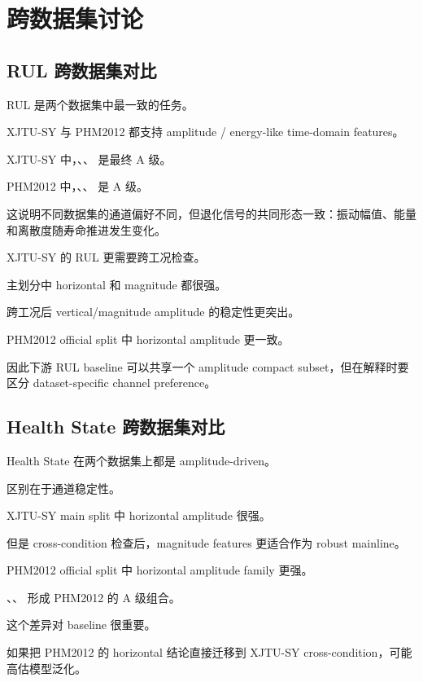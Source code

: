 \section{跨数据集讨论}

\subsection{RUL 跨数据集对比}

RUL 是两个数据集中最一致的任务。

XJTU-SY 与 PHM2012 都支持 amplitude / energy-like time-domain features。

XJTU-SY 中，、、 是最终 A 级。

PHM2012 中，、、 是 A 级。

这说明不同数据集的通道偏好不同，但退化信号的共同形态一致：振动幅值、能量和离散度随寿命推进发生变化。

XJTU-SY 的 RUL 更需要跨工况检查。

主划分中 horizontal 和 magnitude 都很强。

跨工况后 vertical/magnitude amplitude 的稳定性更突出。

PHM2012 official split 中 horizontal amplitude 更一致。

因此下游 RUL baseline 可以共享一个 amplitude compact subset，但在解释时要区分 dataset-specific channel preference。

\subsection{Health State 跨数据集对比}

Health State 在两个数据集上都是 amplitude-driven。

区别在于通道稳定性。

XJTU-SY main split 中 horizontal amplitude 很强。

但是 cross-condition 检查后，magnitude features 更适合作为 robust mainline。

PHM2012 official split 中 horizontal amplitude family 更强。

、、 形成 PHM2012 的 A 级组合。

这个差异对 baseline 很重要。

如果把 PHM2012 的 horizontal 结论直接迁移到 XJTU-SY cross-condition，可能高估模型泛化。

